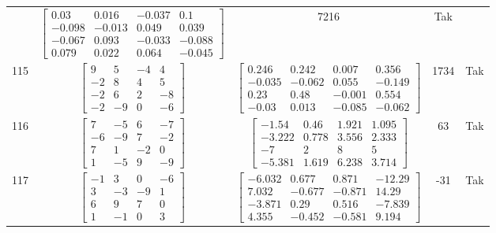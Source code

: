 \documentclass[a4paper,12pt]{article}
\begin{document}
\begin{tabular}{c c c c c}
&
$\begin{bmatrix} 0.03 & 0.016 & -0.037 & 0.1 \\ -0.098 & -0.013 & 0.049 & 0.039 \\ -0.067 & 0.093 & -0.033 & -0.088 \\ 0.079 & 0.022 & 0.064 & -0.045 \end{bmatrix}$
&
7216
&
Tak
\\
115
&
$\begin{bmatrix} 9 & 5 & -4 & 4 \\ -2 & 8 & 4 & 5 \\ -2 & 6 & 2 & -8 \\ -2 & -9 & 0 & -6 \end{bmatrix}$
&
$\begin{bmatrix} 0.246 & 0.242 & 0.007 & 0.356 \\ -0.035 & -0.062 & 0.055 & -0.149 \\ 0.23 & 0.48 & -0.001 & 0.554 \\ -0.03 & 0.013 & -0.085 & -0.062 \end{bmatrix}$
&
1734
&
Tak
\\
116
&
$\begin{bmatrix} 7 & -5 & 6 & -7 \\ -6 & -9 & 7 & -2 \\ 7 & 1 & -2 & 0 \\ 1 & -5 & 9 & -9 \end{bmatrix}$
&
$\begin{bmatrix} -1.54 & 0.46 & 1.921 & 1.095 \\ -3.222 & 0.778 & 3.556 & 2.333 \\ -7 & 2 & 8 & 5 \\ -5.381 & 1.619 & 6.238 & 3.714 \end{bmatrix}$
&
63
&
Tak
\\
117
&
$\begin{bmatrix} -1 & 3 & 0 & -6 \\ 3 & -3 & -9 & 1 \\ 6 & 9 & 7 & 0 \\ 1 & -1 & 0 & 3 \end{bmatrix}$
&
$\begin{bmatrix} -6.032 & 0.677 & 0.871 & -12.29 \\ 7.032 & -0.677 & -0.871 & 14.29 \\ -3.871 & 0.29 & 0.516 & -7.839 \\ 4.355 & -0.452 & -0.581 & 9.194 \end{bmatrix}$
&
-31
&
Tak
\\

\end{tabular}
\end{document}
